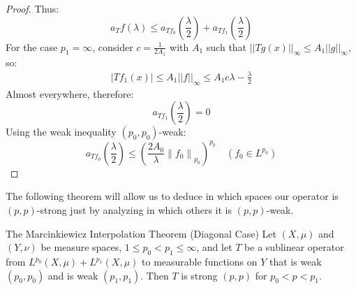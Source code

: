 \begin{proof}{}
  Thus:
  $$a_Tf(\lambda) \leq a_{Tf_0}\left(\frac{\lambda}{2}\right) + a_{Tf_1}\left(\frac{\lambda}{2}\right)$$
  For the case $p_1 = \infty$, consider $c = \frac{1}{2A_1}$ with $A_1$ such that $||Tg(x)||_{\infty} \leq A_1 ||g||_{\infty}$, so:
  \begin{align*}
    |Tf_1(x)| \leq A_1 ||f||_{\infty} \leq A_1 c\lambda - \frac{\lambda}{2}
  \end{align*}
  Almost everywhere, therefore:
  $$a_{Tf_1}\left(\frac{\lambda}{2}\right) = 0$$
  Using the weak inequality $\left(p_0, p_0\right)$-weak: \\
  $$a_{Tf_0}\left(\frac{\lambda}{2}\right) \leq\left(\frac{2 A_0}{\lambda}\left\|f_0\right\|_{p_0}\right)^{p_0} \quad (f_0 \in L^{p_0})$$  
\end{proof}
The following theorem will allow us to deduce in which spaces our operator is $(p,p)$-strong just by analyzing in which others it is $(p,p)$-weak.
\begin{theorem}{The Marcinkiewicz Interpolation Theorem (Diagonal Case)}\label{theorem:marcienkiewickz-theorem}
  Let $(X, \mu)$ and $(Y, \nu)$ be measure spaces, $1 \leq p_0 < p_1 \leq \infty$, and let $T$ be a sublinear operator from $L^{p_0}(X, \mu) + L^{p_1}(X, \mu)$ to measurable functions on $Y$ that is weak $\left(p_0, p_0\right)$ and is weak $\left(p_1, p_1\right)$. Then $T$ is strong $(p, p)$ for $p_0 < p < p_1$.
\end{theorem}

